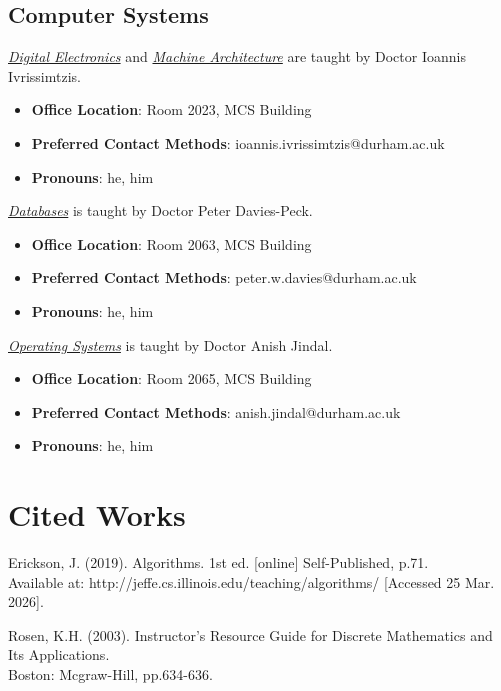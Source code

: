 \subsection{Computer Systems}

\hyperref[cs:section:1.de]{\textit{Digital Electronics}} and \hyperref[cs:section:2.ma]{\textit{Machine Architecture}} are taught by Doctor Ioannis Ivrissimtzis.
\begin{itemize}
    \item \textbf{Office Location}: Room 2023, MCS Building
    \item \textbf{Preferred Contact Methods}: ioannis.ivrissimtzis@durham.ac.uk
    \item \textbf{Pronouns}: he, him
\end{itemize}
    
\hyperref[cs:section:3.db]{\textit{Databases}} is taught by Doctor Peter Davies-Peck.
\begin{itemize}
    \item \textbf{Office Location}: Room 2063, MCS Building
    \item \textbf{Preferred Contact Methods}: peter.w.davies@durham.ac.uk
    \item \textbf{Pronouns}: he, him
\end{itemize}
    
\hyperref[cs:section:4.os]{\textit{Operating Systems}} is taught by Doctor Anish Jindal.
\begin{itemize}
    \item \textbf{Office Location}: Room 2065, MCS Building
    \item \textbf{Preferred Contact Methods}: anish.jindal@durham.ac.uk
    \item \textbf{Pronouns}: he, him
\end{itemize}

\section{Cited Works}

Erickson, J. (2019). Algorithms. 1st ed. [online] Self-Published, p.71. \\ Available at: http://jeffe.cs.illinois.edu/teaching/algorithms/ [Accessed 25 Mar. 2026].\label{cit:1.algorithms}

Rosen, K.H. (2003). Instructor's Resource Guide for Discrete Mathematics and Its Applications. \\ Boston: Mcgraw-Hill, pp.634-636.\label{cit:2.eulerianCircuits}